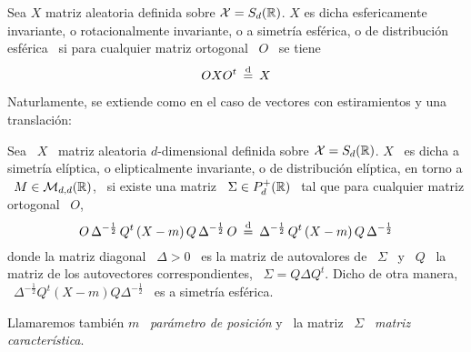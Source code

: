 \begin{definicion}
  Sea  $X$ matriz  aleatoria  definida sobre  $\mathcal{X}  = S_d(\mathbb{R})$.  $X$ es  dicha
  esfericamente  invariante,  o   rotacionalmente  invariante,  o  a  simetr\'ia
  esf\'erica,  o  de  distribuci\'on  esf\'erica  \  si  para  cualquier  matriz
  ortogonal \ $O$ \ se tiene
  \[
  O  X O^t  \: \stackrel{\mathrm{d}}{=}  \: X
  \]
\end{definicion}
%
Naturlamente, se  extiende como en el  caso de vectores con  estiramientos y una
translaci\'on:
%
\begin{definicion}
  Sea \ $X$ \ matriz aleatoria $d$-dimensional definida sobre $\mathcal{X} = S_d(\mathbb{R})$.
  $X$  \ es dicha  a simetr\'ia  el\'iptica, o  elipticalmente invariante,  o de
  distribuci\'on el\'iptica, en  torno a \ $M \in  \mathcal{M}_{d,d}(\mathbb{R})$, \ si existe
  una  matriz  \ $\Sigma  \in  P_d^+(\mathbb{R})$ \  tal  que  para cualquier  matriz
  ortogonal \ $O$,
  \[
  O \, \Delta^{-\frac12} \, Q^t \left( X - m \right) Q \, \Delta^{-\frac12} \, O
  \:  \stackrel{\mathrm{d}}{=}   \:  \Delta^{-\frac12}  \,  Q^t   \left(  X  -  m   \right)  Q  \,
  \Delta^{-\frac12}
  \]
  donde la  matriz diagonal \ $\Delta  > 0$ \ es  la matriz de  autovalores de \
  $\Sigma$ \ y \ $Q$ \ la matriz de los autovectores correspondientes, \ $\Sigma
  = Q \Delta Q^t$.  Dicho de otra manera, \ $\Delta^{-\frac12} Q^t  \left( X - m
  \right) Q \Delta^{-\frac12}$ \ es a simetr\'ia esf\'erica.

  Llamaremos tambi\'en  $m$ \  {\em par\'ametro  de posici\'on} y  \ la  matriz \
  $\Sigma$ \ {\em matriz caracter\'istica}.
\end{definicion}

 
\vspace{2cm}

\centerline{\underline{\hspace{10cm}}}



